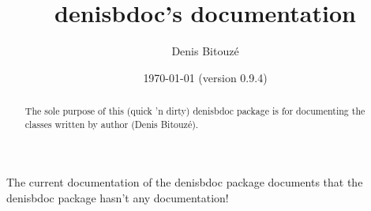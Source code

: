 \documentclass[french]{article}
\begin{document}
\title{\textsf{denisbdoc}'s documentation}
\author{Denis Bitouzé}
\date{\today{} (version 0.9.4)}
\maketitle{}

\begin{abstract}
  The sole purpose of this (quick 'n dirty) \textsf{denisbdoc} package is for
  documenting the classes written by author (Denis Bitouzé).
\end{abstract}

The current documentation of the \textsf{denisbdoc} package documents that the
\textsf{denisbdoc} package hasn't any documentation!
\end{document}
